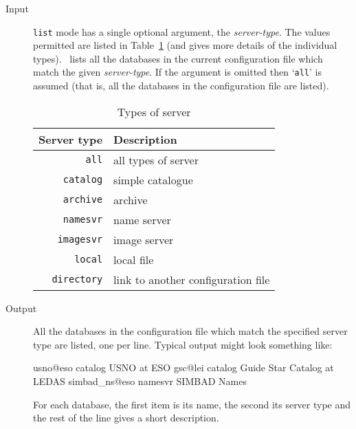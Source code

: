 \documentclass[twoside,11pt]{starlink}
\providecommand{\catremote}{\htmlref{\texttt{catremote}}{CATREMOTE}}
\begin{document}
\begin{description}

  \item[Input] \texttt{list} mode has a single optional argument, the
   \textit{server-type}.  The values permitted are listed in
   Table~\ref{SERVTYPES} (and \cite{SSN75} gives
   more details of the individual types).  \catremote\ lists all the
   databases in the current configuration file which match the given
   \textit{server-type}.  If the argument is omitted then `\texttt{all}' is
   assumed (that is, all the databases in the configuration file are
   listed).

\begin{table}[htbp]

\begin{center}
\begin{tabular}{rl}
Server type     & Description \\ \hline
\texttt{all}       & all types of server \\
\texttt{catalog}   & simple catalogue \\
\texttt{archive}   & archive \\
\texttt{namesvr}   & name server \\
\texttt{imagesvr}  & image server \\
\texttt{local}     & local file \\
\texttt{directory} & link to another configuration file \\
\end{tabular}
\end{center}

\caption{Types of server \label{SERVTYPES} }

\end{table}

  \item[Output] All the databases in the configuration file which match
   the specified server type are listed, one per line.  Typical output
   might look something like:

  \begin{terminalv}
usno@eso  catalog  USNO at ESO
gsc@lei  catalog  Guide Star Catalog at LEDAS
simbad_ns@eso  namesvr  SIMBAD Names
  \end{terminalv}

   For each database, the first item is its name, the second its server
   type and the rest of the line gives a short description.

\end{description}
\end{document}

